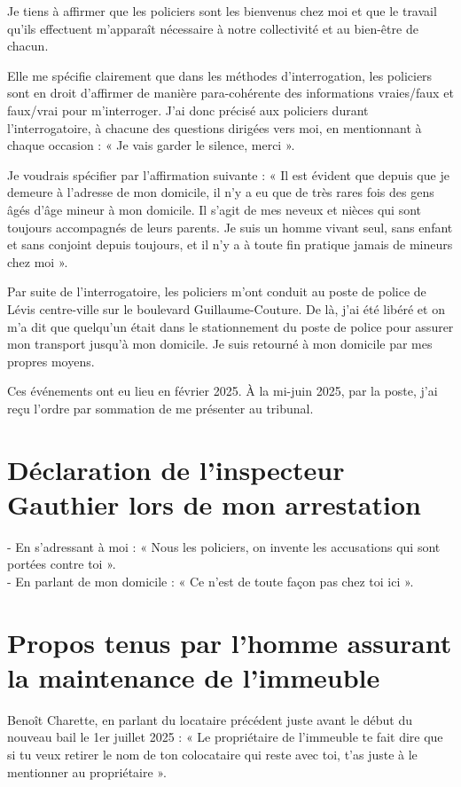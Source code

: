 \documentclass[12pt]{article}
\begin{document}
Je tiens à affirmer que les policiers sont les bienvenus chez moi et que le travail qu’ils effectuent m’apparaît nécessaire à notre collectivité et au bien-être de chacun.

Elle me spécifie clairement que dans les méthodes d’interrogation, les policiers sont en droit d’affirmer de manière para-cohérente des informations vraies/faux et faux/vrai pour m’interroger. J’ai donc précisé aux policiers durant l’interrogatoire, à chacune des questions dirigées vers moi, en mentionnant à chaque occasion : « Je vais garder le silence, merci ».

Je voudrais spécifier par l’affirmation suivante : « Il est évident que depuis que je demeure à l’adresse de mon domicile, il n’y a eu que de très rares fois des gens âgés d’âge mineur à mon domicile. Il s’agit de mes neveux et nièces qui sont toujours accompagnés de leurs parents. Je suis un homme vivant seul, sans enfant et sans conjoint depuis toujours, et il n’y a à toute fin pratique jamais de mineurs chez moi ».

Par suite de l’interrogatoire, les policiers m’ont conduit au poste de police de Lévis centre-ville sur le boulevard Guillaume-Couture. De là, j’ai été libéré et on m’a dit que quelqu’un était dans le stationnement du poste de police pour assurer mon transport jusqu’à mon domicile. Je suis retourné à mon domicile par mes propres moyens.

Ces événements ont eu lieu en février 2025. À la mi-juin 2025, par la poste, j’ai reçu l’ordre par sommation de me présenter au tribunal.

\section*{Déclaration de l’inspecteur Gauthier lors de mon arrestation}

- En s’adressant à moi : « Nous les policiers, on invente les accusations qui sont portées contre toi ».\\
- En parlant de mon domicile : « Ce n’est de toute façon pas chez toi ici ».

\section*{Propos tenus par l’homme assurant la maintenance de l’immeuble}

Benoît Charette, en parlant du locataire précédent juste avant le début du nouveau bail le 1er juillet 2025 :  
« Le propriétaire de l’immeuble te fait dire que si tu veux retirer le nom de ton colocataire qui reste avec toi, t’as juste à le mentionner au propriétaire ».
\end{document}
